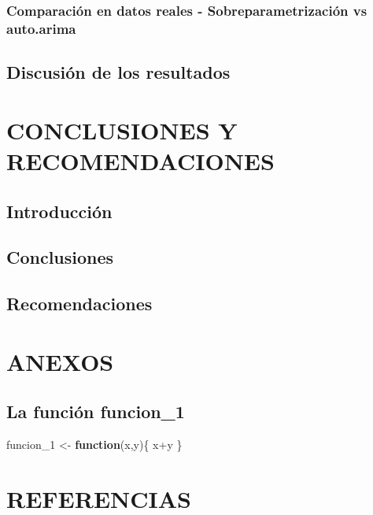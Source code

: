 \documentclass[
]{article}
\newenvironment{Shaded}{\begin{snugshade}}{\end{snugshade}}
\newcommand{\ControlFlowTok}[1]{\textcolor[rgb]{0.13,0.29,0.53}{\textbf{#1}}}
\newcommand{\NormalTok}[1]{#1}
\newcommand{\OtherTok}[1]{\textcolor[rgb]{0.56,0.35,0.01}{#1}}
\newcommand{\SpecialCharTok}[1]{\textcolor[rgb]{0.00,0.00,0.00}{#1}}
\begin{document}
\subsubsection{Comparación en datos reales - Sobreparametrización vs auto.arima}

\subsection{Discusión de los resultados}

\newpage

\section{CONCLUSIONES Y RECOMENDACIONES}

\subsection{Introducción}

\subsection{Conclusiones}

\subsection{Recomendaciones}

\newpage

\section{ANEXOS}

\subsection{La función funcion\_1}

\label{funcion1}

\begin{Shaded}
\begin{Highlighting}[]
\NormalTok{funcion\_1 }\OtherTok{\textless{}{-}} \ControlFlowTok{function}\NormalTok{(x,y)\{}
\NormalTok{    x}\SpecialCharTok{+}\NormalTok{y}
\NormalTok{\}}
\end{Highlighting}
\end{Shaded}

\newpage

\section{REFERENCIAS}
\end{document}
